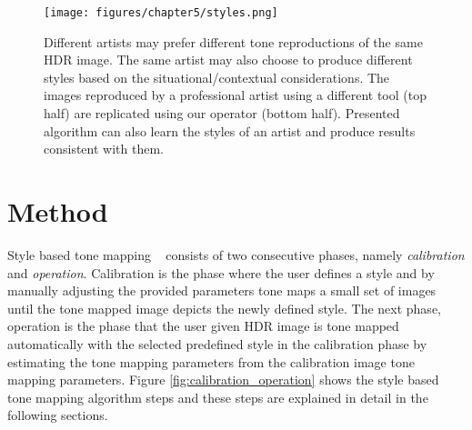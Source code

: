 \begin{figure}
\begin{center}
\texttt{[image: figures/chapter5/styles.png]}
\caption{Different artists may prefer different tone reproductions of the same HDR image. The same artist may also choose to produce different styles based on the situational/contextual considerations. The images reproduced by a professional artist using a different tool (top half) are replicated using our operator (bottom half). Presented algorithm can also learn the styles of an artist and produce results consistent with them.}
\label{fig:styles}
\end{center}
\end{figure}
\section{Method}
Style based tone mapping ~\cite{akyuz2013style} consists of two consecutive phases, namely \emph{calibration} and \emph{operation}. Calibration is the phase where the user defines a style and by manually adjusting the provided parameters tone maps a small set of images until the tone mapped image depicts the newly defined style. The next phase, operation is the phase that the user given HDR image is tone mapped automatically with the selected predefined style in the calibration phase by estimating the tone mapping parameters from the calibration image tone mapping parameters. Figure \ref{fig:calibration_operation} shows the style based tone mapping algorithm steps and these steps are explained in detail in the following sections.

